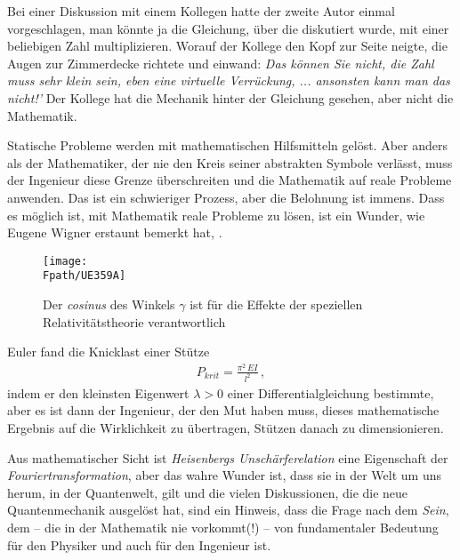 Bei einer Diskussion mit einem Kollegen hatte der zweite Autor einmal vorgeschlagen, man k\"{o}nnte ja die Gleichung, \"{u}ber die diskutiert wurde, mit einer beliebigen Zahl multiplizieren. Worauf der Kollege den Kopf zur Seite neigte, die Augen zur Zimmerdecke richtete und einwand: {\em \glq Das k\"{o}nnen Sie nicht, die Zahl muss sehr klein sein, eben eine virtuelle Verr\"{u}ckung, ... ansons\-ten kann man das nicht!'\/} Der Kollege hat die Mechanik hinter der Gleichung gesehen, aber nicht die Mathematik.\label{Korrektur30}

Statische Probleme werden mit mathematischen Hilfsmitteln gel\"{o}st. Aber anders als der Mathematiker, der nie den Kreis seiner abstrakten Symbole verl\"{a}sst, muss der Ingenieur diese Grenze \"{u}berschreiten und die Mathematik auf reale Probleme anwenden. Das ist ein schwieriger Prozess, aber die Belohnung ist immens. Dass es m\"{o}glich ist, mit Mathematik reale Probleme zu l\"{o}sen, ist ein Wunder, wie Eugene Wigner erstaunt bemerkt hat, \cite{Wigner}.
\begin{figure}[tbp]
\centering
\if {} \sidecaption \fi
\texttt{[image: \\Fpath/UE359A]}
\caption{Der {\em cosinus\/} des Winkels $\gamma$ ist f\"{u}r die Effekte der speziellen Relativit\"{a}tstheorie verantwortlich} \label{UE359}
\end{figure}%

Euler fand die Knicklast einer St\"{u}tze
\begin{align}
P_{krit} = \frac{\pi^2\,EI}{l^2}\,,
\end{align}
indem er den kleinsten Eigenwert $\lambda > 0$ einer Differentialgleichung bestimmte, aber es ist dann der Ingenieur, der den Mut haben muss, dieses mathematische Ergebnis auf die Wirklichkeit zu \"{u}bertragen, St\"{u}tzen danach zu dimensionieren.

Aus mathematischer Sicht ist {\em Heisenbergs Unsch\"{a}rferelation\/} eine Eigenschaft der {\em Fouriertransformation\/}, aber das wahre Wunder ist, dass sie in der Welt um uns herum, in der Quantenwelt, gilt und die vielen Diskussionen, die die neue Quantenmechanik ausgel\"{o}st hat, sind ein Hinweis, dass die Frage nach dem {\em Sein\/}, dem \grq{} -- die in der Mathematik nie vorkommt(!) -- von fundamentaler Bedeutung f\"{u}r den Physiker und auch f\"{u}r den Ingenieur ist.

